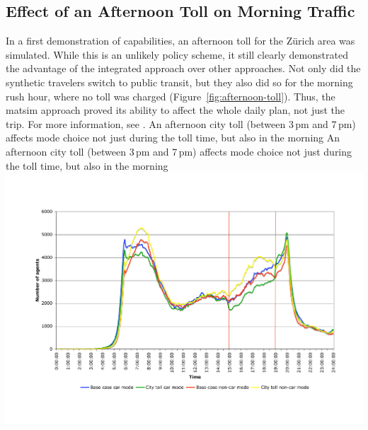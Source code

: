 \subsection{Effect of an Afternoon Toll on Morning Traffic}
In a first demonstration of capabilities, an afternoon toll for the Zürich area was simulated. While this is an unlikely policy scheme, it still clearly demonstrated the advantage of the integrated approach over other approaches. Not only did the synthetic travelers switch to public transit, but they also did so for the morning rush hour, where no toll was charged (Figure~\ref{fig:afternoon-toll}). Thus, the \gls{matsim} approach proved its ability to affect the whole daily plan, not just the trip. For more information, see \citet{RieserEtAl_TRBTDF_2008}.
%
\createfigure%
{An afternoon city toll (between 3\,pm and 7\,pm) affects mode choice not just during the toll time, but also in the morning}%
{An afternoon city toll (between 3\,pm and 7\,pm) affects mode choice not just during the toll time, but also in the morning}%
{\label{fig:afternoon-toll}}%
{\includegraphics[width=0.99\hsize,trim=2cm 2.5cm 2cm 3cm,clip]{extending/figures/roadpricing/583vs585onRoute.pdf}}%
{}

